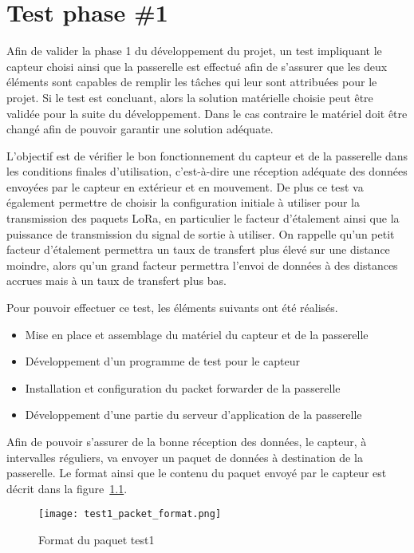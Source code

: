\chapter{Test phase \#1}\label{ch:test_1}

Afin de valider la phase 1 du développement du projet, un test impliquant le capteur choisi ainsi que la passerelle est effectué afin de s'assurer que les deux éléments sont capables de remplir les tâches qui leur sont attribuées pour le projet. Si le test est concluant, alors la solution matérielle choisie peut être validée pour la suite du développement. Dans le cas contraire le matériel doit être changé afin de pouvoir garantir une solution adéquate.

L'objectif est de vérifier le bon fonctionnement du capteur et de la passerelle dans les conditions finales d'utilisation, c'est-à-dire une réception adéquate des données envoyées par le capteur en extérieur et en mouvement. De plus ce test va également permettre de choisir la configuration initiale à utiliser pour la transmission des paquets LoRa, en particulier le facteur d'étalement ainsi que la puissance de transmission du signal de sortie à utiliser. On rappelle qu'un petit facteur d'étalement permettra un taux de transfert plus élevé sur une distance moindre, alors qu'un grand facteur permettra l'envoi de données à des distances accrues mais à un taux de transfert plus bas.

Pour pouvoir effectuer ce test, les éléments suivants ont été réalisés.

\begin{itemize}
\item Mise en place et assemblage du matériel du capteur et de la passerelle
\item Développement d'un programme de test pour le capteur
\item Installation et configuration du packet forwarder de la passerelle
\item Développement d'une partie du serveur d'application de la passerelle
\end{itemize}

Afin de pouvoir s'assurer de la bonne réception des données, le capteur, à intervalles réguliers, va envoyer un paquet de données à destination de la passerelle. Le format ainsi que le contenu du paquet envoyé par le capteur est décrit dans la figure~\ref{fig:test1_paquet}.

\begin{figure}[htb]
\centering 
\texttt{[image: test1\_packet\_format.png]} 
\caption{Format du paquet test1}
\label{fig:test1_paquet}
\end{figure}

